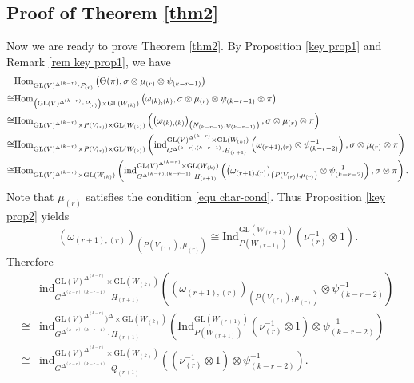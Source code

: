 \documentclass[11pt,reqno]{amsart}
\renewcommand{\1}{{\mathbf{1}}} \newcommand{\sB}{{\mathscr{B}}}
\newcommand{\GL}{{\mathrm{GL}}}\newcommand{\G}{{\mathrm{G}}}
\newcommand{\Ind}{{\mathrm{Ind}}} \newcommand{\ind}{{\mathrm{ind}}}
\theoremstyle{plain}
\theoremstyle{definition}
\numberwithin{equation}{section}
\begin{document}
\subsection{Proof of Theorem \ref{thm2}}\label{subsec pf of thm2}  Now we are ready to prove Theorem \ref{thm2}. 
By Proposition  \ref{key prop1} and Remark \ref{rem key prop1}, we have
$$\begin{aligned}&\Hom_{\GL(V)^{\Delta^{(k-r)}}\cdot P_{(r)}}\left(\Theta(\pi),\sigma\otimes\mu_{(r)}\otimes\psi_{(k-r-1)}\right)\\ 
\cong&\Hom_{\left(\GL(V)^{\Delta^{(k-r)}}\cdot P_{(r)}\right)\times\GL(W_{(k)})}\left(\omega_{(k),(k)},\sigma\otimes\mu_{(r)}\otimes\psi_{(k-r-1)}\otimes\pi\right)\\
\cong&\Hom_{\GL(V)^{\Delta^{(k-r)}}\times P(V_{(r)})\times\GL(W_{(k)})}\left(\left(\omega_{(k),(k)}\right)_{\left(N_{(k-r-1)},\psi_{(k-r-1)}\right)},\sigma\otimes\mu_{(r)}\otimes\pi\right)\\
\cong&\Hom_{\GL(V)^{\Delta^{(k-r)}}\times P(V_{(r)})\times\GL(W_{(k)})}\left(\ind_{G^{\Delta^{(k-r),(k-r-1)}}\cdot H_{(r+1)}}^{\GL(V)^{\Delta^{(k-r)}}\times\GL(W_{(k)})}\left(\omega_{(r+1),(r)}\otimes\psi_{(k-r-2)}^{-1}\right),\sigma\otimes\mu_{(r)}\otimes\pi\right)\\
\cong&\Hom_{\GL(V)^{\Delta^{(k-r)}}\times\GL(W_{(k)})}\left(\ind_{G^{\Delta^{(k-r),(k-r-1)}}\cdot H_{(r+1)}}^{\GL(V)^{\Delta^{(k-r)}}\times\GL(W_{(k)})}\left(\left(\omega_{(r+1),(r)}\right)_{\left(P(V_{(r)}),\mu_{(r)}\right)}\otimes\psi_{(k-r-2)}^{-1}\right),\sigma\otimes\pi\right).
\end{aligned}$$ 
Note that $\mu_{(r)}$ satisfies the condition \eqref{equ char-cond}. Thus Proposition \ref{key prop2} yields
$$\left(\omega_{(r+1),(r)}\right)_{\left(P(V_{(r)}),\mu_{(r)}\right)}\cong\Ind^{\GL(W_{(r+1)})}_{P(W_{(r+1)})}\left(\nu^{-1}_{(r)}\otimes1\right).$$ Therefore
$$\begin{aligned}&\ind_{G^{\Delta^{(k-r),(k-r-1)}}\cdot H_{(r+1)}}^{\GL(V)^{\Delta^{(k-r)}}\times\GL(W_{(k)})}\left(\left(\omega_{(r+1),(r)}\right)_{\left(P(V_{(r)}),\mu_{(r)}\right)}\otimes\psi_{(k-r-2)}^{-1}\right)\\
\cong&\ind_{G^{\Delta^{(k-r),(k-r-1)}}\cdot H_{(r+1)}}^{\GL(V)^{\Delta^{(k-r)}})^\Delta\times\GL(W_{(k)})}\left(\Ind^{\GL(W_{(r+1)})}_{P(W_{(r+1)})}\left(\nu^{-1}_{(r)}\otimes1\right)\otimes\psi_{(k-r-2)}^{-1}\right)\\
\cong&\ind_{G^{\Delta^{(k-r),(k-r-1)}}\cdot Q_{(r+1)}}^{\GL(V)^{\Delta^{(k-r)}}\times\GL(W_{(k)})}\left(\left(\nu^{-1}_{(r)}\otimes1\right)\otimes\psi_{(k-r-2)}^{-1}\right).
\end{aligned}$$
\end{document}
